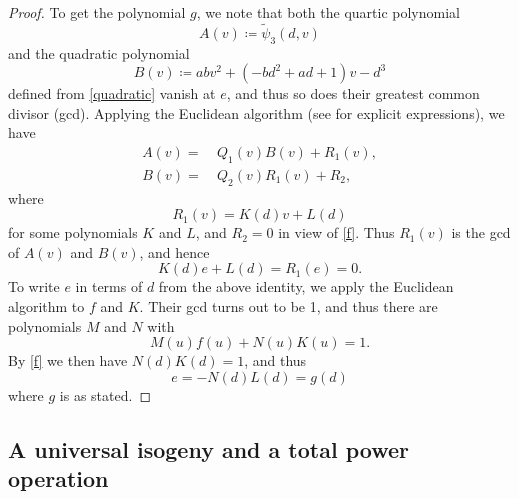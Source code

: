 \documentclass[microtype]{gtpart}     %
\theoremstyle{remark}
\theoremstyle{definition}
\newcommand{\Tp}{\widetilde{\psi}}
\newcommand{\ce}{\coloneqq}
\begin{document}
\begin{proof}
 To get the polynomial $g$, we note that both the quartic polynomial 
 \[
  A(v) \ce \Tp_3(d,v) 
 \]
 and the quadratic polynomial 
 \[
  B(v) \ce a b v^2 + (-b d^2 + a d + 1) v - d^3 
 \]
 defined from \eqref{quadratic} vanish at $e$, and thus so does their 
 greatest common divisor (gcd).  Applying the Euclidean algorithm (see 
  for explicit expressions), we have 
 \begin{equation*}
 \begin{split}
  A(v) = & ~ Q_1(v) B(v) + R_1(v), \\
  B(v) = & ~ Q_2(v) R_1(v) + R_2, 
 \end{split}
 \end{equation*}
 where 
 \[
  R_1(v) = K(d) v + L(d) 
 \]
 for some polynomials $K$ and $L$, and $R_2 = 0$ in view of \eqref{f}.  Thus 
 $R_1(v)$ is the gcd of $A(v)$ and $B(v)$, and hence 
 \[
  K(d) e + L(d) = R_1(e) = 0.  
 \]
 To write $e$ in terms of $d$ from the above identity, we apply the Euclidean 
 algorithm to $f$ and $K$.  Their gcd turns out to be 1, and thus there are 
 polynomials $M$ and $N$ with 
 \[
  M(u) f(u) + N(u) K(u) = 1.  
 \]
 By \eqref{f} we then have $N(d) K(d) = 1$, and thus 
 \[
  e = -N(d) L(d) = g(d) 
 \]
 where $g$ is as stated.  
\end{proof}


\subsection{A universal isogeny and a total power operation}
\end{document}
